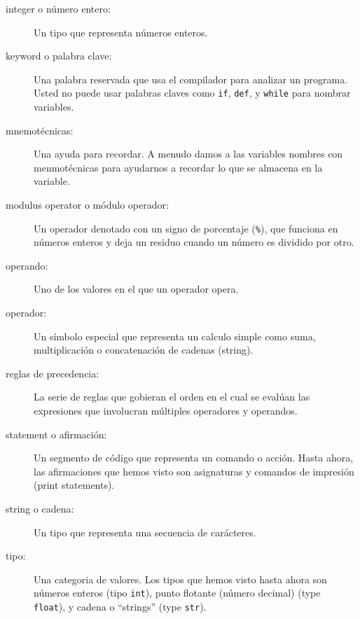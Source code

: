 \begin{ex}
\begin{description}
\item[integer o n\'umero entero:] Un tipo que representa n\'umeros enteros.

\item[keyword o palabra clave:]  Una palabra reservada que usa el compilador para analizar un programa. Usted no puede usar palabras claves como {\tt if}, {\tt  def}, y {\tt while} para nombrar
variables.

\item[mnemot\'ecnicas:] Una ayuda para recordar. A menudo damos a las variables nombres con menmot\'ecnicas para ayudarnos a recordar lo que se almacena en la variable.

\item[modulus operator o m\'odulo operador:]  Un operador denotado con un signo de porcentaje
({\tt \%}), que funciona en n\'umeros enteros y deja un residuo cuando un n\'umero es dividido por otro.

\item[operando:]  Uno de los valores en el que un operador opera.

\item[operador:]  Un s\'imbolo especial que representa un calculo simple como suma, multiplicaci\'on o concatenaci\'on de cadenas (string).

\item[reglas de precedencia:]  La serie de reglas que gobieran el orden en el cual se eval\'uan las expresiones que involucran m\'ultiples operadores y operandos.

\item[statement o afirmaci\'on:]  Un segmento de c\'odigo que representa un comando o acci\'on. Hasta ahora, las afirmaciones que hemos visto son asignaturas y comandos de impresi\'on (print statements).

\item[string o cadena:] Un tipo que representa una secuencia de car\'acteres.

\item[tipo:] Una categoria de valores.  Los tipos que hemos visto hasta ahora son n\'umeros enteros (tipo {\tt int}), punto flotante (n\'umero decimal) (type {\tt
float}), y cadena o ``strings'' (type {\tt str}).


\end{description}
\end{ex}
